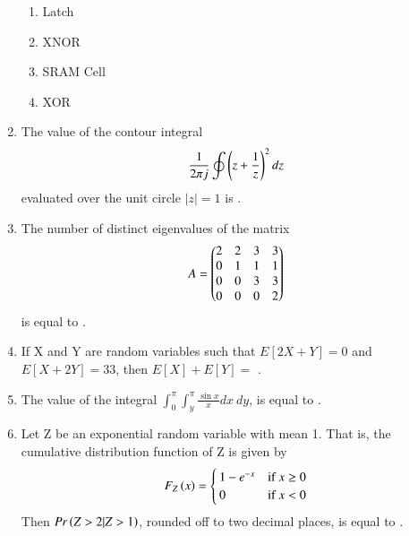 \documentclass[a4paper, 11pt]{article}
\begin{document}
\begin{enumerate}
    \begin{enumerate}
        \item Latch
        \item XNOR
        \item SRAM Cell
        \item XOR
    \end{enumerate}
    
    \hfill{}

    \item The value of the contour integral
    \[
    \frac{1}{2\pi j}\oint\left(z+\frac{1}{z}\right)^{2}dz
    \]
    evaluated over the unit circle $|z|=1$ is \underline{\hspace{2cm}}.
    
    \hfill{}

    \item The number of distinct eigenvalues of the matrix
    \[
    A = \begin{pmatrix}2 & 2 & 3 & 3 \\ 0 & 1 & 1 & 1 \\ 0 & 0 & 3 & 3 \\ 0 & 0 & 0 & 2\end{pmatrix}
    \]
    is equal to \underline{\hspace{2cm}}.
    
    \hfill{}
    
    \item If X and Y are random variables such that $E[2X+Y]=0$ and $E[X+2Y]=33$, then $E[X]+E[Y] = $ \underline{\hspace{2cm}}.

    \hfill{}

    \item The value of the integral $\int_{0}^{\pi}\int_{y}^{\pi}\frac{\sin x}{x}dx~dy$, is equal to \underline{\hspace{2cm}}.
    
    \hfill{}

    \item Let Z be an exponential random variable with mean 1. That is, the cumulative distribution function of Z is given by
    \[
    F_{Z}\left(x\right) = 
    \begin{cases}
        1-e^{-x} & \text{if } x \ge 0 \\
        0 & \text{if } x < 0
    \end{cases}
    \]
    Then $Pr\left(Z>2|Z>1\right)$, rounded off to two decimal places, is equal to \underline{\hspace{2cm}}.
    

\end{enumerate}
\end{document}
